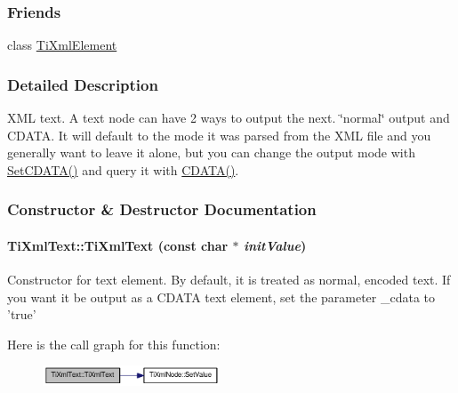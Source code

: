 \subsubsection*{Friends}
\begin{DoxyCompactItemize}
\item 
\hypertarget{class_ti_xml_text_ab6592e32cb9132be517cc12a70564c4b}{
class \hyperlink{class_ti_xml_text_ab6592e32cb9132be517cc12a70564c4b}{TiXmlElement}}
\label{class_ti_xml_text_ab6592e32cb9132be517cc12a70564c4b}

\end{DoxyCompactItemize}


\subsubsection{Detailed Description}
XML text. A text node can have 2 ways to output the next. \char`\"{}normal\char`\"{} output and CDATA. It will default to the mode it was parsed from the XML file and you generally want to leave it alone, but you can change the output mode with \hyperlink{class_ti_xml_text_acb17ff7c5d09b2c839393445a3de5ea9}{SetCDATA()} and query it with \hyperlink{class_ti_xml_text_ad1a6a6b83fa2271022dd97c072a2b586}{CDATA()}. 

\subsubsection{Constructor \& Destructor Documentation}
\hypertarget{class_ti_xml_text_af659e77c6b87d684827f35a8f4895960}{
\paragraph[{TiXmlText}]{\setlength{\rightskip}{0pt plus 5cm}TiXmlText::TiXmlText (const char $\ast$ {\em initValue})}\hfill}
\label{class_ti_xml_text_af659e77c6b87d684827f35a8f4895960}
Constructor for text element. By default, it is treated as normal, encoded text. If you want it be output as a CDATA text element, set the parameter \_\-cdata to 'true' 

Here is the call graph for this function:\nopagebreak
\begin{figure}[H]
\begin{center}
\leavevmode
\includegraphics[width=149pt]{class_ti_xml_text_af659e77c6b87d684827f35a8f4895960_cgraph}
\end{center}
\end{figure}


